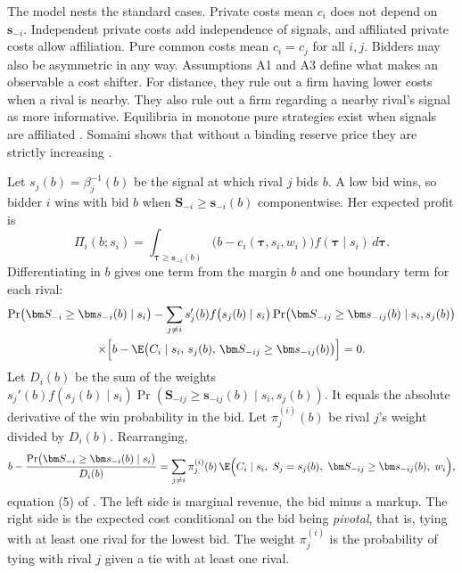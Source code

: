 The model nests the standard cases. Private costs mean $c_i$ does not depend on $\bm s_{-i}$. Independent
private costs add independence of signals, and affiliated private costs allow affiliation. Pure common costs
mean $c_i=c_j$ for all $i,j$. Bidders may also be asymmetric in any way. Assumptions A1 and A3 define what makes
an observable a cost shifter. For distance, they rule out a firm having lower costs when a rival is nearby. They
also rule out a firm regarding a nearby rival's signal as more informative. Equilibria in monotone pure strategies
exist when signals are affiliated \citep{RenyZamir2004}. Somaini shows that without a binding reserve price they
are strictly increasing \citep[Proposition~1]{Somaini2020}.

 Let $s_j(b)=\beta_j^{-1}(b)$ be the signal at which rival $j$ bids $b$. A low
bid wins, so bidder $i$ wins with bid $b$ when $\bm S_{-i}\ge\bm s_{-i}(b)$ componentwise. Her expected
profit is
\begin{equation*}
  \Pi_i(b;s_i)=\int_{\bm\tau\ge\bm s_{-i}(b)}\bigl(b-c_i(\bm\tau,s_i,w_i)\bigr)f(\bm\tau\mid s_i)\,d\bm\tau .
\end{equation*}
Differentiating in $b$ gives one term from the margin $b$ and one boundary term for each rival:
\begin{multline*}
  \Pr\bigl(\bm S_{-i}\ge\bm s_{-i}(b)\mid s_i\bigr)
  -\sum_{j\ne i}s_j'(b)f\bigl(s_j(b)\mid s_i\bigr)\Pr\bigl(\bm S_{-ij}\ge\bm s_{-ij}(b)\mid s_i,s_j(b)\bigr)\\
  \times\Bigl[b-\E\bigl(C_i\mid s_i,\,s_j(b),\,\bm S_{-ij}\ge\bm s_{-ij}(b)\bigr)\Bigr]=0 .
\end{multline*}
Let $D_i(b)$ be the sum of the weights $s_j'(b)f(s_j(b)\mid s_i)\Pr(\bm S_{-ij}\ge\bm s_{-ij}(b)\mid s_i,s_j(b))$.
It equals the absolute derivative of the win probability in the bid. Let $\pi^{(i)}_j(b)$ be rival $j$'s weight
divided by $D_i(b)$. Rearranging,
\begin{equation}\label{eq:15-som-foc}
  b-\frac{\Pr\bigl(\bm S_{-i}\ge\bm s_{-i}(b)\mid s_i\bigr)}{D_i(b)}
  =\sum_{j\ne i}\pi^{(i)}_j(b)\,\E\Bigl(C_i\mid s_i,\ S_j=s_j(b),\ \bm S_{-ij}\ge\bm s_{-ij}(b),\ w_i\Bigr),
\end{equation}
equation (5) of \citet{Somaini2020}. The left side is marginal revenue, the bid minus a markup. The right side
is the expected cost conditional on the bid being \emph{pivotal}, that is, tying with at least one rival for the
lowest bid. The weight $\pi^{(i)}_j$ is the probability of tying with rival $j$ given a tie with at least one
rival.

